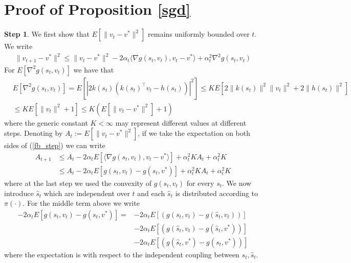 \documentclass[twoside,11pt]{article}
\begin{document}


\appendix






\section{Proof of Proposition \ref{sgd}} \label{sgd_proof}

{\bf Step 1}.
We first show that $E\left[\|v_t-v^*\|^2\right]$ remains uniformly bounded over $t$. We write
\begin{align}\label{fb_step}
\|v_{t+1}-v^*\|^2 \leq  \|v_t - v^*\|^2 - 2\alpha_t \langle \nabla g(s_t,v_t), v_t-v^*\rangle + \alpha_t^2 \nabla^2g(s_t,v_t)
\end{align}
For $E[\nabla^2 g(s_t,v_t)] $ we have that 
\begin{align*}
&E[\nabla^2 g(s_t,v_t)]  = E\left[ \left| 2k(s_t)  (k(s_t)^\intercal v_t - h(s_t)  )  \right|^2\right]\leq K E \left[ 2\|k(s_t)\|^2 \|v_t\|^2 + 2\|h(s_t)\|^2\right]\\
& \leq K E\left[   \|v_t\|^2 +1 \right] \leq K \left(E \left[  \|v_t-v^*\|^2 \right] + 1\right)
\end{align*}
where the generic constant $K<\infty$ may represent different values at different steps.  Denoting by $A_t:= E\left[\|v_t-v^*\|^2\right]$, if we take the expectation on both sides of (\ref{fb_step}) we can write
\begin{align}\label{square_step}
A_{t+1}&  \leq A_t - 2\alpha_t E\left[ \langle \nabla g(s_t,v_t), v_t - v^* \rangle\right] + \alpha_t^2 K A_t +  \alpha_t^2 K     \nonumber\\
&\leq  A_t - 2\alpha_t E\left[ g(s_t,v_t) - g(s_t,v^*) \right] + \alpha_t^2 K A_t +  \alpha_t^2 K 
\end{align}
where at the last step we used the convexity of $g(s_t,v_t)$ for every $s_t$. 
 We now introduce $\hat{s}_t$ which are independent over $t$ and each $\hat{s}_t$ is distributed according to $\pi(\cdot)$.  For the middle term above we write
\begin{align}\label{middle_term}
 -2\alpha_t E\left[ g(s_t,v_t) - g(s_t,v^*) \right] =  & -2\alpha_t E\left[   \left(g(s_t,v_t) - g(\hat{s}_t,v_t)\right)\right]  \nonumber\\
& -2\alpha_t   E\left[   \left(g(\hat{s}_t,v_t) - g(\hat{s}_t,v^*)\right)\right] \nonumber \\
& -2\alpha_t   E\left[  \left(g(\hat{s}_t,v^*) - g(s_t,v^*)\right)\right] 
\end{align}
where the expectation is with respect to the independent coupling between $s_t,\hat{s}_t$.
\end{document}
